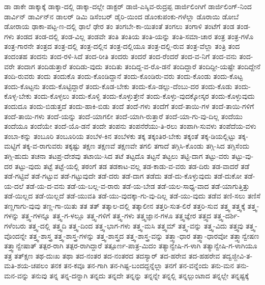ಡಾ
ಡಾಕೇ
ಡಾಕ್ಕಾಕ್ಕೆ
ಡಾಕ್ಕಾ-ದಲ್ಲಿ
ಡಾಕ್ಕಾ-ದಲ್ಲೇ
ಡಾಕ್ಟರ್
ಡಾಜಿ-ಎಸ್ಶಿವ-ರುದ್ರಪ್ಪ
ಡಾರ್ಜಿಲಿಂಗಿಗೆ
ಡಾರ್ಜಿಲಿಂಗ್‌-ನಿಂದ
ಡಾರ್ವಿನ್
ಡಾರ್ವಿನ್‌ನ
ಡಾಲರ್
ಡಿಮಿ
ಡಿಸೆಂಬರ್
ಡೈರಿ-ಯಿಂದ
ಡೊಂಕುಪಂಕು-ಗಳೆಲ್ಲಾ
ಡೊರಾಯಿ
ಡೋಬೆ
ಡೋರಾಯ
ಢಾಕಾ-ಪಟ್ಟ-ಣ-ದಲ್ಲಿ
ಢಾಲೆ
ಢೇರ
ತಂ
ತಂಗಬೇ-ಕಾ-ಯಿತಂತೆ
ತಂಗಲು
ತಂಗಾಳಿ
ತಂಟೆಗೆ
ತಂಡ
ತಂಡ-ಗಳು
ತಂಡದ
ತಂಡ-ದಲ್ಲಿ
ತಂಡ-ವಿಲ್ಲ
ತಂಡವೇ
ತಂತಿ
ತಂತಿಯ
ತಂತಿ-ಯನ್ನು
ತಂತಿ-ಸಮಾ-ಚಾರ
ತಂತ್ರ
ತಂತ್ರ-ಗಳೊ
ತಂತ್ರ-ಗಾರನೇ
ತಂತ್ರದ
ತಂತ್ರ-ದಲ್ಲಿ
ತಂತ್ರ-ದಲ್ಲಿನ
ತಂತ್ರ-ದಲ್ಲಿಯೂ
ತಂತ್ರ-ದಲ್ಲಿ-ರುವ
ತಂತ್ರ-ವೆಲ್ಲಾ
ತಂತ್ರಿ
ತಂದ
ತಂದಂತಹ
ತಂದನು
ತಂದ-ರಳಿ-ಸಿದೆ
ತಂದ-ರೀತಿ
ತಂದರು
ತಂದರೆ
ತಂದ-ರೆಂದರೆ
ತಂದ-ವ-ನಿಗೆ
ತಂದ-ವನು
ತಂದ-ವರೇ
ತಂದಾಗ
ತಂದಿಡುತ್ತಾರೆ
ತಂದಿಡು-ವುದು
ತಂದಿತು
ತಂದಿದ್ದ-ವ-ರೊ-ಡನೆ
ತಂದಿದ್ದಾರೆ
ತಂದಿದ್ದೀ-ಯಷ್ಟೇ
ತಂದಿದ್ದೇನೆ
ತಂದಿ-ರುವರು
ತಂದು
ತಂದುಕೊ
ತಂದು-ಕೊಂಡಿದ್ದಾನೆ
ತಂದು-ಕೊಂಡಿರು-ವರು
ತಂದು-ಕೊಂಡು
ತಂದು-ಕೊಟ್ಟ
ತಂದು-ಕೊಟ್ಟನು
ತಂದು-ಕೊಟ್ಟಿದ್ದಾರೆ
ತಂದು-ಕೊಡ-ಬೇಕು
ತಂದು-ಕೊ-ಡಲ್ಲು-ದೆಂಬು-ದರ
ತಂದು-ಕೊಡು
ತಂದು-ಕೊಳ್ಳ-ಬೇಕು
ತಂದು-ಕೊಳ್ಳಲು
ತಂದು-ಕೊಳ್ಳಿ
ತಂದು-ಕೊಳ್ಳುತ್ತೇನೆ
ತಂದು-ಕೊಳ್ಳು-ವುದಕ್ಕೋಸ್ಕರ
ತಂದು-ಕೊಳ್ಳುವುದು
ತಂದುದೂ
ತಂದು-ಬಿಡುತ್ತದೆ
ತಂದು-ಹಾಕಿ-ಬಿಡು
ತಂದೆ
ತಂದೆ-ಗಳು
ತಂದೆಗೆ
ತಂದೆ-ತಾಯಿ-ಗಳ
ತಂದೆ-ತಾಯಿ-ಗಳಿಗೆ
ತಂದೆ-ತಾಯಿ-ಗಳು
ತಂದೆ-ಯನ್ನು
ತಂದೆ-ಯಾಗಲೀ
ತಂದೆ-ಯಾಗಿ-ರುತ್ತಾರೆ
ತಂದೆ-ಯಾ-ಗು-ವು-ದಿಲ್ಲ
ತಂದೆಯು
ತಂದೆಯೂ
ತಂದೆಯೇ
ತಂದೆ-ಯೊ-ಡನೆ
ತಂದೇ
ತಂಪನು
ತಂಪನೆರೆಯು-ತಿ-ರಲು
ತಂಪಾಗಿ-ಸುವಳು
ತಂಪೆದೆಯ-ವಳು
ತಂಬಾ-ಕನ್ನು
ತಂಬೂರಿ
ತಂಬೂರಿಯ
ತಂಬೆಳ-ಕಿನ
ತಂಬೆಳಕು
ತಕ್ಕ
ತಕ್ಕಂತಿರ-ಬೇಕು
ತಕ್ಕಂತೆ
ತಕ್ಕ-ಡಿಯಲ್ಲಿಟ್ಟು
ತಕ್ಕ-ಮಟ್ಟಿಗೆ
ತಕ್ಕ-ವ-ರಾಗುವರು
ತಕ್ಕಷ್ಟು
ತಕ್ಷಣ
ತಕ್ಷಣವೆ
ತಕ್ಷಣವೇ
ತಗಲಿ
ತಗಾದೆ
ತಗ್ಗಿಸಿ-ಕೊಂಡು
ತಗ್ಗಿ-ಸಿದ
ತಗ್ಗಿಸೆಂದು
ತಗ್ಗಿ-ಹುದು
ತಚನಾ
ತಟಪ್ರ-ದೇಶವು
ತಟಾಯಿ-ಸಿದ
ತಟೆ
ತಟ್ಟದೊ
ತಟ್ಟನೆ
ತಟ್ಟಲು
ತಟ್ಟಿ-ದಾಗ
ತಟ್ಟು-ವರು
ತಟ್ಟು-ವು-ದರ
ತಟ್ಟು-ವುದು
ತಟ್ಟೆ
ತಟ್ಟೆ-ಯಲ್ಲಿ
ತಠಂಗೆ
ತಡ
ತಡಕಾಟ-ವಲ್ಲ
ತಡ-ಕಾಡು-ವ-ವರು
ತಡ-ದಿರು
ತಡ-ವಾದರೆ
ತಡೆ
ತಡೆ-ಗಟ್ಟಿವೆ
ತಡೆ-ಗಟ್ಟುವ
ತಡೆ-ಗಟ್ಟುವುದೇ
ತಡೆ-ದರು
ತಡೆ-ದಾಗ
ತಡೆದು
ತಡೆ-ದು-ಕೊಳ್ಳುವುದು
ತಡೆ-ದುಕೋ
ತಡೆ-ಯ-ದಲೆ
ತಡೆ-ಯ-ದ-ವನು
ತಡೆ-ಯ-ಬಲ್ಲ-ವ-ರಾರು
ತಡೆ-ಯ-ಬೇಡ
ತಡೆ-ಯಲ-ಸಾಧ್ಯ-ವಾದ
ತಡೆ-ಯಾಗುತ್ತಿತ್ತು
ತಡೆ-ಯಿಲ್ಲದ
ತಡೆ-ಯಿಲ್ಲದೆ
ತಡೆ-ಯುವತಿ
ತಡೆ-ಯು-ವುದಕ್ಕಾ-ಗು-ವು-ದಿಲ್ಲ
ತಡೆ-ಯು-ವುದು
ತಡೆವ
ತಣಿ-ಸಲು
ತಣಿಸೆ
ತಣ್ಣಗಾಗು-ವುವು
ತಣ್ಣ-ಗಾ-ಯಿತು
ತತ
ತತ್
ತತ್ಕಾಲ-ದಲ್ಲಿ
ತತ್ಕಾಲೀನ
ತತ್ತರಿ-ಸುತ-ಲಿರೆ
ತತ್ತರಿ-ಸುವ
ತತ್ತ್ವ
ತತ್ತ್ವಕ್ಕೆ
ತತ್ತ್ವ-ಗಳನ್ನು
ತತ್ತ್ವ-ಗಳನ್ನೂ
ತತ್ತ್ವ-ಗ-ಳಲ್ಲೂ
ತತ್ತ್ವ-ಗಳಿಗೆ
ತತ್ತ್ವ-ಗಳು
ತತ್ತ್ವಜ್ಞಾನ-ಗಳೂ
ತತ್ತ್ವಜ್ಞೇರ
ತತ್ತ್ವದ
ತತ್ತ್ವ-ದರ್ಶಿ-ಗಳೆಂಬರು
ತತ್ತ್ವ-ದಲ್ಲಿ
ತತ್ತ್ವದಿ
ತತ್ತ್ವ-ದಿಂದ
ತತ್ತ್ವ-ಭಾಗ-ಗಳು
ತತ್ತ್ವ-ಮಸಿ
ತತ್ತ್ವಮ್
ತತ್ತ್ವ-ವನ್ನು
ತತ್ತ್ವ-ವಿದು
ತತ್ತ್ವವು
ತತ್ತ್ವ-ವೊಂದನ್ನೇ
ತತ್ತ್ವ-ಶಾಸ್ತ್ರ
ತತ್ತ್ವ-ಶಾಸ್ತ್ರ-ಗಳನ್ನು
ತತ್ತ್ವ-ಶಾಸ್ತ್ರದ
ತತ್ತ್ವ-ಶಾಸ್ತ್ರ-ವನ್ನು
ತತ್ತ್ವಾ-ಧಾರ
ತತ್ತ್ವಾ-ಧಾರವೋ
ತತ್ತ್ವಾನ್ವೇಷಣ
ತತ್ತ್ವಾನ್ವೇಷಾತ್
ತತ್ಪರ-ರಾಗಿ
ತತ್ಪರ-ರಾಗಿದ್ದಾರೆ
ತತ್ಪೂರ್ಣ-ಪಾತ್ರ-ಮಿದಂ
ತತ್ಯಾನ್ವೇಷಿ-ಗ-ಳಾಗಿ
ತತ್ಯಾನ್ವೇಷಿ-ಗ-ಳಾಗಿಯೂ
ತತ್ರ
ತತ್‌ಕ್ಷಣ
ತಥ-ದುಃಖ
ತಥಾ
ತದ-ನಂತರ
ತದ-ನಂತರದ
ತದಸ್ಯಾರ್‌
ತದ-ಹರೇವ
ತದ-ಹಹರೇವ
ತದ್ವಜ್ಜೀವಿ-ತ-ಮತಿ-ಶಯ-ಚಪಲಂ
ತನಕ
ತನ-ಕವೂ
ತನ-ಗಾಗಿ
ತನ-ಗಿಷ್ಟ-ಬಂದದ್ದನ್ನೆಲ್ಲಾ
ತನಗೆ
ತನ-ವನ್ನೆಂದು
ತನು-ಮನ
ತನು-ಮನ-ವನ್ನು
ತನುವು
ತನ್ನ
ತನ್ನ-ದನ್ನಾಗಿ
ತನ್ನದು
ತನ್ನದೇ
ತನ್ನನ್ನು
ತನ್ನನ್ನೇ
ತನ್ನಲ್ಲಿ
ತನ್ನಲ್ಲುಂಟಾದ
ತನ್ನಲ್ಲೇ
ತನ್ನಷ್ಟಕ್ಕೆ
